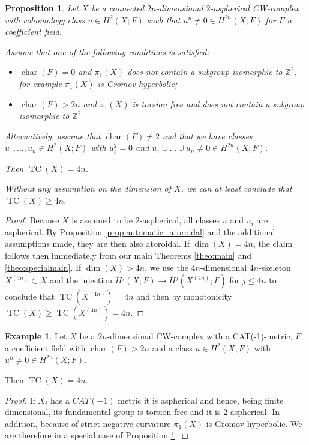 \documentclass[a4paper,twoside]{article}
\theoremstyle{plain}
\newtheorem{proposition}[theorem]{Proposition}
\theoremstyle{definition}
\newtheorem{example}[theorem]{Example}
\theoremstyle{remark}
\newcommand{\integers}{\mathbb{Z}}
\DeclareMathOperator{\characteristic}{char}
\DeclareMathOperator{\TC}{TC}
\begin{document}
\begin{proposition}\label{prop:2-aspherical_pi1}
  Let $X$ be a connected $2n$-dimensional $2$-aspherical CW-complex with
  cohomology 
  class $u\in H^2(X;F)$ such that $u^n\ne 0\in H^{2n}(X;F)$ for $F$ a
  coefficient field.

Assume that one of the following conditions is satisfied:
\begin{itemize}
\item $\characteristic(F)=0 $ and $\pi_1(X)$ does not contain a subgroup isomorphic to
  $\integers^2$, for example $\pi_1(X)$ is Gromov hyperbolic;
\item   $\characteristic(F)>2n$ and $\pi_1(X)$ is torsion free and does not contain a subgroup isomorphic to
  $\integers^2$

\end{itemize}

  Alternatively, assume that $\characteristic(F)\ne 2$ and that we have classes
  $u_1,\dots,u_n\in H^2(X;F)$ with $u_i^2=0$ and $u_1\cup\dots\cup u_n\ne 0
  \in H^{2n}(X;F)$. 

  
    Then $\TC(X)=4n$.

\smallskip


  Without any assumption on the dimension of $X$, we can at least conclude that
  $\TC(X)\ge 4n$.
\end{proposition}
\begin{proof}
  Because $X$ is assumed to be $2$-aspherical, all classes $u$ and $u_i$ are
  aspherical. By Proposition \ref{prop:automatic_atoroidal} and the additional
  assumptions made, they are then also
  atoroidal. If $\dim(X)=4n$, the claim follows then immediately from our main Theorems
  \ref{theo:main} and \ref{theo:specialmain}. If $\dim(X)>4n$, we use the
  $4n$-dimensional $4n$-skeleton $X^{(4n)}\subset X$ and the injection
  $H^j(X;F)\to H^j(X^{(4n)};F)$ for $j\le 4n$ to conclude that
  $\TC(X^{(4n)})=4n$ and then by monotonicity $\TC(X)\ge \TC(X^{(4n)})=4n$. 
\end{proof}

\begin{example}
  Let $X$ be a $2n$-dimensional CW-complex with a CAT(-1)-metric, $F$ a
  coefficient field with $\characteristic(F)>2n$ and a class
  $u\in H^2(X;F)$ with $u^n\ne 0\in H^{2n}(X;F)$.

  Then $\TC(X) =4n$.
\end{example}
\begin{proof}
  If $X_i$ has a $CAT(-1)$ metric it is aspherical and hence, being finite
  dimensional, its fundamental 
  group is torsion-free and it is $2$-aspherical. In addition, because of
  strict negative curvature $\pi_1(X)$ is Gromov hyperbolic. We are therefore in a
  special case of Proposition \ref{prop:2-aspherical_pi1}.
\end{proof}
\end{document}
